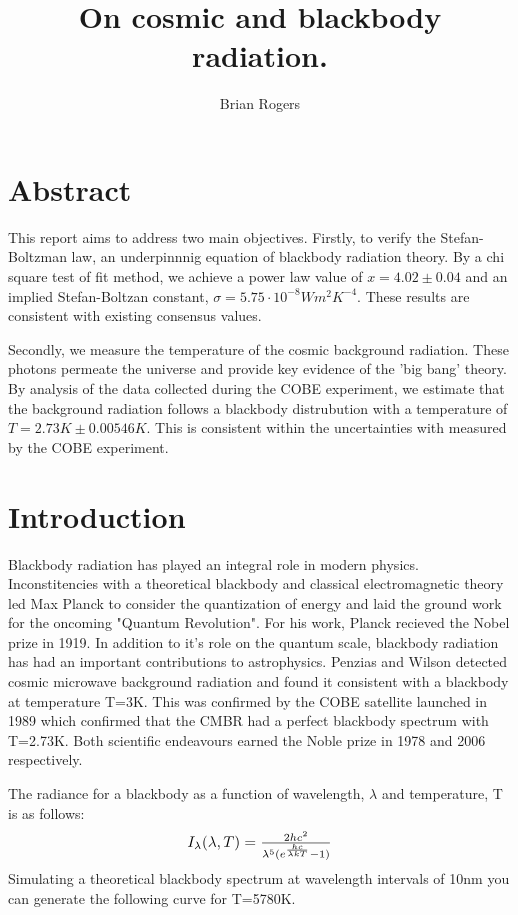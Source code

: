 \documentclass{article}%
\title{On cosmic and blackbody radiation.}%
\author{Brian Rogers}%
\begin{document}
%
\normalsize%
\maketitle%
\section{Abstract}%
\label{sec:Abstract}%

This report aims to address two main objectives. Firstly, to verify the Stefan{-}Boltzman law, 
an underpinnnig equation of blackbody radiation theory.
By a chi square test of fit method, we achieve a power law value of $x=4.02 \pm 0.04$ 
and an implied Stefan-Boltzan constant, $\sigma =5.75 \cdot 10^{-8}Wm^{2}K^{-4} $. 
These results are consistent with existing consensus values. \par
Secondly, we measure the temperature of the cosmic background radiation. These photons permeate the universe and
provide key evidence of the 'big bang' theory.  By analysis of the data collected during the COBE experiment, 
we estimate that the background radiation follows a blackbody distrubution with a temperature of $T = 2.73K \pm 0.00546K$.
This is consistent within the uncertainties with measured by the COBE experiment. 

%
\section{Introduction}%
\label{sec:Introduction}%

Blackbody radiation has played an integral role in modern physics.
Inconstitencies with a theoretical blackbody and classical electromagnetic theory
led Max Planck to consider the quantization of energy and laid the ground work for the oncoming "Quantum Revolution".\cite{Baggot}
For his work, Planck recieved the Nobel prize in 1919.
In addition to it's role on the quantum scale, blackbody radiation has had an important contributions to astrophysics.
Penzias and Wilson detected cosmic microwave background radiation and found it consistent with a blackbody
at temperature T=3K. This was confirmed by the COBE satellite launched in 1989 which confirmed that 
the CMBR had a perfect blackbody spectrum with T=2.73K. Both scientific endeavours earned the Noble prize in 1978 and 2006 respectively.  


The radiance for a blackbody as a function of wavelength, $\lambda$ and temperature, T is as follows:
\begin{equation}
  \resizebox{.3\hsize}{!}{$I_{\lambda}(\lambda,T) = \frac{2hc^2}{\lambda^5 (e^ \frac{hc}{\lambda kT} - 1)}$}
  \end{equation}
Simulating a theoretical blackbody spectrum at wavelength intervals of 10nm you can generate the following 
curve for T=5780K.
\end{document}

